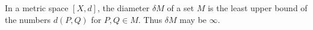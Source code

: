 In a metric space $[X, d]$, the diameter $\delta M$ of a set $M$ is the least upper bound of the numbers $d(P, Q)$ for $P, Q \in M$. Thus $\delta M$ may be $\infty$.
